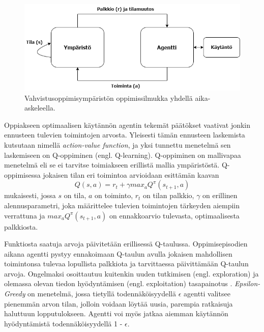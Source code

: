 \documentclass[utf8]{gradu3}
\begin{document}
\begin{figure}[h]
\centering
\includegraphics[width=12cm]{reinflearning.png}
\caption{Vahvistusoppimisympäristön oppimissilmukka yhdellä aika-askeleella.}
\label{reinflearning}
\end{figure}

Oppiakseen optimaalisen käytännön agentin tekemät päätökset vaativat jonkin ennusteen tulevien toimintojen arvosta. Yleisesti tämän ennusteen laskemista kutsutaan nimellä \textit{action-value function}, ja yksi tunnettu menetelmä sen laskemiseen on Q-oppiminen (engl. Q-learning). Q-oppiminen on mallivapaa menetelmä eli se ei tarvitse toimiakseen erillistä mallia ympäristöstä. Q-oppimisessa jokaisen tilan eri toimintoa arvioidaan \textcite{arulkumaran2017brief} esittämän kaavan \[Q(s,a) = r_t + \gamma max_a Q^\pi (s_{t+1},a)\] mukaisesti, jossa \(s\) on tila, \(a\) on toiminto, \(r_t\) on tilan palkkio, $\gamma$ on erillinen alennusparametri, joka määrittelee tulevien toimintojen tärkeyden aiempiin verrattuna ja \(max_a Q^\pi (s_{t+1},a)\) on ennakkoarvio tulevasta, optimaalisesta palkkiosta.

Funktiosta saatuja arvoja päivitetään erillisessä Q-taulussa. Oppimisepisodien aikana agentti pystyy ennakoimaan Q-taulun avulla jokaisen mahdollisen toimintonsa tulevaa lopullista palkkiota ja tarvittaessa päivittämään Q-taulun arvoja. Ongelmaksi osoittautuu kuitenkin uuden tutkimisen (engl. exploration) ja olemassa olevan tiedon hyödyntämisen (engl. exploitation) tasapainotus \parencite{arulkumaran2017brief}. \textit{Epsilon-Greedy} on menetelmä, jossa tietyllä todennäköisyydellä $\epsilon$ agentti valitsee pienemmän arvon tilan, jolloin voidaan löytää uusia, parempia ratkaisuja haluttuun lopputulokseen. Agentti voi myös jatkaa aiemman käytännön hyödyntämistä todennäköisyydellä 1 - $\epsilon$.
\end{document}
